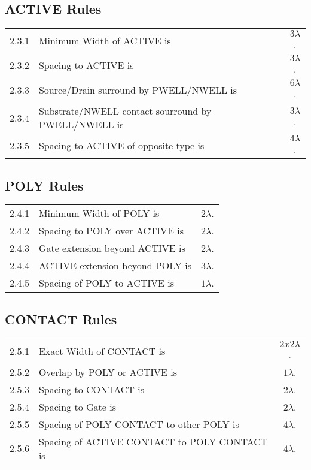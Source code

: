 \subsection{ACTIVE Rules}\label{design_rules_active_rules}

\begin{flushleft}
    \begin{tabular}{c l c}
        2.3.1   & Minimum Width of ACTIVE is & $3 \lambda$. \\
        2.3.2   & Spacing to ACTIVE is & $3 \lambda$. \\
        2.3.3   & Source/Drain surround by PWELL/NWELL is & $6 \lambda$. \\
        2.3.4   & Substrate/NWELL contact sourround by PWELL/NWELL is & $3 \lambda$. \\
        2.3.5   & Spacing to ACTIVE of opposite type is & $4 \lambda$. \\
    \end{tabular}
\end{flushleft}

\subsection{POLY Rules}\label{design_rules_poly_rules}

\begin{flushleft}
    \begin{tabular}{c l c}
        2.4.1   & Minimum Width of POLY is & $2 \lambda$. \\
        2.4.2   & Spacing to POLY over ACTIVE is & $2 \lambda$. \\
        2.4.3   & Gate extension beyond ACTIVE is & $2 \lambda$. \\
        2.4.4   & ACTIVE extension beyond POLY is & $3 \lambda$. \\
        2.4.5   & Spacing of POLY to ACTIVE is & $1 \lambda$. \\
    \end{tabular}
\end{flushleft}

\subsection{CONTACT Rules}\label{design_rules_contact_rules}

\begin{flushleft}
    \begin{tabular}{c l c}
        2.5.1   & Exact Width of CONTACT is & $2x2 \lambda$. \\
        2.5.2   & Overlap by POLY or ACTIVE is & $1 \lambda$. \\
        2.5.3   & Spacing to CONTACT is & $2 \lambda$. \\
        2.5.4   & Spacing to Gate is & $2 \lambda$. \\
        2.5.5   & Spacing of POLY CONTACT to other POLY is & $4 \lambda$. \\
        2.5.6   & Spacing of ACTIVE CONTACT to POLY CONTACT is & $4 \lambda$. \\
    \end{tabular}
\end{flushleft}

